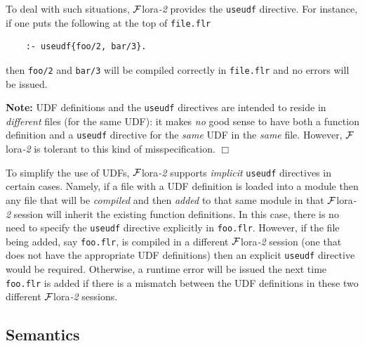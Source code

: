 \documentclass[11pt]{article}
\newcommand{\FLSYSTEM}{{\mbox{\sc ${\cal F}${lora}\rm\emph{-2}}}\xspace}
\newcommand{\flrext}{flr}
\begin{document}
To deal with such situations, \FLSYSTEM provides the \texttt{useudf}
directive. For instance, if one puts the following at the top of
\texttt{file.\flrext}
\begin{verbatim}
    :- useudf{foo/2, bar/3}.
\end{verbatim}
then \texttt{foo/2} and \texttt{bar/3}
will be compiled correctly in \texttt{file.\flrext} and
no errors will be issued. 

\noindent
\textbf{Note:} UDF definitions and the \texttt{useudf} directives are intended
to reside in \emph{different} files (for the same UDF):
it makes \emph{no} good sense to have both a function definition and a
\texttt{useudf} directive for the \emph{same} UDF in the \emph{same}
file. However, \FLSYSTEM is tolerant to this kind of misspecification.
\hfill$\Box$

To simplify the use of UDFs, \FLSYSTEM supports \emph{implicit}
\texttt{useudf} directives in certain cases. Namely, if a file with
a UDF definition is loaded into a module then any file that will be
\emph{compiled} and then \emph{added} to that same module in that \FLSYSTEM session
will inherit the existing function definitions. In this case, there is no
need to specify the \texttt{useudf} directive explicitly in
\texttt{foo.\flrext}.
However, if the file being added, say \texttt{foo.\flrext},
is compiled in a different \FLSYSTEM session
(one that does not have the appropriate UDF definitions) then an explicit
\texttt{useudf} directive would be required. Otherwise, a runtime
error will be issued the next time \texttt{foo.\flrext} is added if there is a
mismatch between the UDF definitions in these two different \FLSYSTEM sessions. 


\subsection{Semantics}
\end{document}
